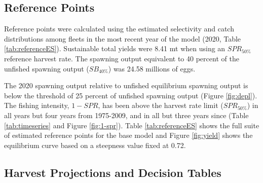 \documentclass[11pt,
  english,
  a4paper,
]{article}
\begin{document}
\hypertarget{reference-points}{%
\subsection{Reference Points}\label{reference-points}}

\leavevmode\tagmcend\tagstructend


Reference points were calculated using the estimated selectivity and catch distributions among fleets in the most recent year of the model (2020, Table \ref{tab:referenceES}). Sustainable total yields were 8.41 mt when using an {\(SPR_{50\%}\)\leavevmode\tagmcend\tagstructend} reference harvest rate. The spawning output equivalent to 40 percent of the unfished spawning output ({\(SB_{40\%}\)\leavevmode\tagmcend\tagstructend}) was 24.58 millions of eggs.

\leavevmode\tagmcend\tagstructend\par


The 2020 spawning output relative to unfished equilibrium spawning output is below the threshold of 25 percent of unfished spawning output (Figure \ref{fig:depl}). The fishing intensity, {\(1-SPR\)\leavevmode\tagmcend\tagstructend}, has been above the harvest rate limit ({\(SPR_{50\%}\)\leavevmode\tagmcend\tagstructend}) in all years but four years from 1975-2009, and in all but three years since (Table \ref{tab:timeseries} and Figure \ref{fig:1-spr}). Table \ref{tab:referenceES} shows the full suite of estimated reference points for the base model and Figure \ref{fig:yield} shows the equilibrium curve based on a steepness value fixed at 0.72.

\leavevmode\tagmcend\tagstructend\par


\hypertarget{harvest-projections-and-decision-tables}{%
\subsection{Harvest Projections and Decision Tables}\label{harvest-projections-and-decision-tables}}
\end{document}
